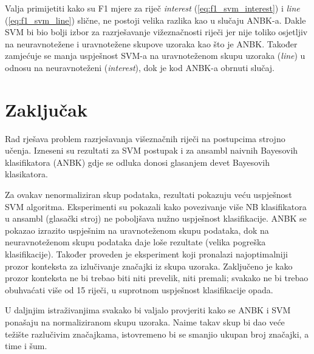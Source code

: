 \documentclass[10pt, a4paper]{article}
\begin{document}
Valja primijetiti kako su F1 mjere za riječ \emph{interest} (\ref{eq:f1_svm_interest}) i \emph{line} 
(\ref{eq:f1_svm_line}) slične, ne postoji velika razlika kao u slučaju ANBK-a.
Dakle SVM bi bio bolji izbor za razrješavanje vižeznačnosti riječi jer
nije toliko osjetljiv na neuravnotežene i uravnotežene skupove uzoraka
kao što je ANBK.
Također zamjećuje se manja uspješnost SVM-a na uravnoteženom
skupu uzoraka (\emph{line}) u odnosu na neuravnoteženi (\emph{interest}), 
dok je kod ANBK-a obrnuti slučaj.

\section{Zaključak}
Rad rješava problem razrješavanja višeznačnih riječi na postupcima
strojno učenja. Izneseni su rezultati za SVM postupak i za
ansambl naivnih Bayesovih klasifikatora (ANBK) gdje se odluka donosi
glasanjem devet Bayesovih klasikatora.

Za ovakav nenormaliziran skup podataka, rezultati pokazuju
veću uspješnost SVM algoritma. Eksperimenti su pokazali kako povezivanje više 
NB klasifikatora u ansambl (glasački stroj) ne poboljšava nužno uspješnost klasifikacije.
ANBK se pokazao
izrazito uspješnim na uravnoteženom skupu podataka, dok
na neuravnoteženom skupu podataka daje loše rezultate (velika
pogreška klasifikacije).
Također proveden je eksperiment
koji pronalazi najoptimalniji prozor konteksta za izlučivanje
značajki iz skupa uzoraka. Zaključeno je kako prozor konteksta ne bi trebao
biti niti prevelik, niti premali; svakako ne bi trebao obuhvaćati više od 15 riječi, 
u suprotnom uspješnost klasifikacije opada.

U daljnjim istraživanjima svakako bi valjalo provjeriti kako se ANBK i SVM ponašaju na
normaliziranom skupu uzoraka. Naime takav skup bi dao veće težište razlučivim značajkama,
istovremeno bi se smanjio ukupan broj značajki, a time i šum.


 
\end{document}
